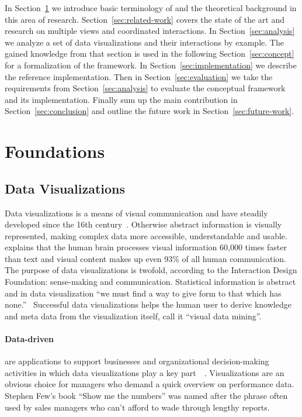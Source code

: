 In Section~\ref{sec:theory} we introduce basic terminology of \cmvs{} and the theoretical background in this area of research.
Section~\ref{sec:related-work} covers the state of the art and research on multiple views and coordinated interactions.
In Section~\ref{sec:analysis} we analyze a set of data visualizations and their interactions by example.
The gained knowledge from that section is used in the following Section~\ref{sec:concept} for a formalization of the \cmv{} framework.
In Section~\ref{sec:implementation} we describe the reference implementation.
Then in Section~\ref{sec:evaluation} we take the requirements from Section~\ref{sec:analysis} to evaluate the conceptual framework and its implementation.
Finally sum up the main contribution in Section~\ref{sec:conclusion} and outline the future work in Section~\ref{sec:future-work}.

\clearpage
\section{Foundations}\label{sec:theory}

\subsection{Data Visualizations}
Data visualizations is a means of visual communication and have steadily developed since the 16th century~\cite{Friendly2001}.
Otherwise abstract information is visually represented, making complex data more accessible, understandable and usable.
\textcite{Kusinitz2014} explains that the human brain processes visual information 60,000 times faster than text and visual content makes up even 93\% of all human communication.
The purpose of data visualizations is twofold, according to the Interaction Design Foundation: sense-making and communication.
Statistical information is abstract and in data visualization ``we must find a way to give form to that which has none.''~\cite{Few2013}
Successful data visualizations helps the human user to derive knowledge and meta data from the visualization itself, \textcite{Nocke2002} call it ``visual data mining''.

\paragraph{Data-driven \dss{}} are applications to support businesses and organizational decision-making activities in which data visualizations play a key part~\cite{Nada2007}~\cite{Poleto2015}.
Visualizations are an obvious choice for managers who demand a quick overview on performance data.
Stephen Few's book ``Show me the numbers'' was named after the phrase often used by sales managers who can't afford to wade through lengthy reports.

